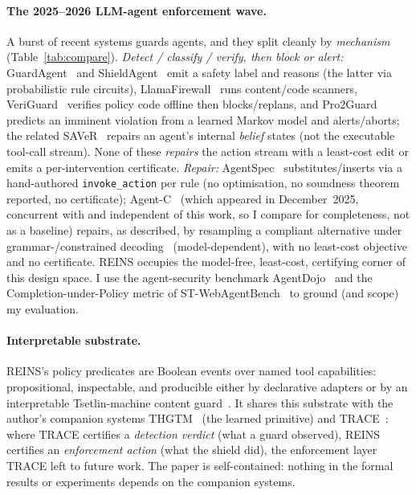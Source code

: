 \documentclass[11pt]{article}
\begin{document}
\paragraph{The 2025--2026 LLM-agent enforcement wave.} A burst of recent systems
guards agents, and they split cleanly by \emph{mechanism}
(Table~\ref{tab:compare}). \emph{Detect / classify / verify, then block or
alert:} GuardAgent~\citep{xiang2024guardagent} and
ShieldAgent~\citep{chen2025shieldagent} emit a safety label and reasons (the
latter via probabilistic rule circuits), LlamaFirewall~\citep{chennabasappa2025llamafirewall}
runs content/code scanners, VeriGuard~\citep{veriguard2025} verifies policy code
offline then blocks/replans, and Pro2Guard~\citep{wang2025proguard} predicts an
imminent violation from a learned Markov model and alerts/aborts; the related
SAVeR~\citep{yuan2026saver} repairs an agent's internal \emph{belief} states
(not the executable tool-call stream). None of these \emph{repairs} the action
stream with a least-cost edit or emits a per-intervention certificate.
\emph{Repair:} AgentSpec~\citep{wang2025agentspec} substitutes/inserts via a
hand-authored \texttt{invoke\_action} per rule (no optimisation, no soundness
theorem reported, no certificate); Agent-C~\citep{kamath2025agentc} (which
appeared in December~2025, concurrent with and independent of this work, so I
compare for completeness, not as a baseline) repairs, as described, by resampling
a compliant alternative under grammar-/constrained
decoding~\citep{willard2023guided} (model-dependent), with no least-cost objective
and no certificate. REINS occupies the model-free, least-cost, certifying corner of
this design space. I use the agent-security benchmark
AgentDojo~\citep{debenedetti2024agentdojo} and the Completion-under-Policy metric
of ST-WebAgentBench~\citep{levy2025stwebagentbench} to ground (and scope) my
evaluation.

\paragraph{Interpretable substrate.} REINS's policy predicates are Boolean events
over named tool capabilities: propositional, inspectable, and producible either
by declarative adapters or by an interpretable Tsetlin-machine content
guard~\citep{granmo2018tsetlin}. It shares this substrate with the author's
companion systems THGTM~\citep{debes2026thgtm} (the learned primitive) and
TRACE~\citep{debes2026trace}: where TRACE certifies a \emph{detection verdict}
(what a guard observed), REINS certifies an \emph{enforcement action} (what the
shield did), the enforcement layer TRACE left to future work. The paper is
self-contained: nothing in the formal results or experiments depends on the
companion systems.
\end{document}

